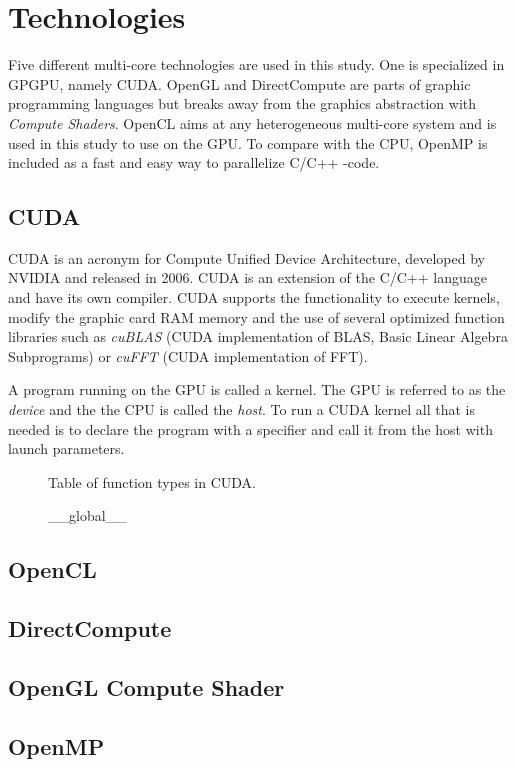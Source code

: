 \chapter{Technologies}

Five different multi-core technologies are used in this study. One is specialized in GPGPU, namely CUDA. OpenGL and DirectCompute are parts of graphic programming languages but breaks away from the graphics abstraction with \textit{Compute Shaders}. OpenCL aims at any heterogeneous multi-core system and is used in this study to use on the GPU. To compare with the CPU, OpenMP is included as a fast and easy way to parallelize C/C++ -code.

\section{CUDA}

CUDA is an acronym for Compute Unified Device Architecture, developed by NVIDIA and released in 2006. CUDA is an extension of the C/C++ language and have its own compiler. CUDA supports the functionality to execute kernels, modify the graphic card RAM memory and the use of several optimized function libraries such as \textit{cuBLAS} (CUDA implementation of BLAS, Basic Linear Algebra Subprograms) or \textit{cuFFT} (CUDA implementation of FFT).

A program running on the GPU is called a kernel. The GPU is referred to as the \textit{device} and the the CPU is called the \textit{host}. To run a CUDA kernel all that is needed is to declare the program with a specifier and call it from the host with launch parameters.

\begin{figure}
	
	\caption{Table of function types in CUDA.}
	\label{tab:cuda:func-types}
\end{figure}

\begin{figure}
	\centering
	\lstset{language=C++}
	\begin{framed}
	\begin{listing}
\_\_global\_\_
	\end{listing}
	\end{framed}
\end{figure}

\section{OpenCL}

\section{DirectCompute}

\section{OpenGL Compute Shader}

\section{OpenMP}